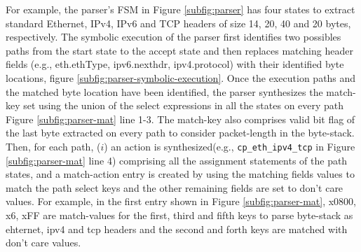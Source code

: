 \documentclass[letterpaper,twocolumn,10pt]{article}
\begin{document}
For example, the parser's FSM in Figure \ref{subfig:parser} has four states to extract standard Ethernet, IPv4, IPv6 and TCP headers of size 14, 20, 40 and 20 bytes, respectively. The symbolic execution of the parser first identifies two possibles paths from the start state to the accept state and  then replaces matching header fields (e.g., eth.ethType, ipv6.nexthdr, ipv4.protocol) with their identified byte locations, figure \ref{subfig:parser-symbolic-execution}.
Once the execution paths and the matched byte location have been identified, the parser synthesizes the match-key set using the union of the select expressions in all the states on every path Figure \ref{subfig:parser-mat} line 1-3.
The match-key also comprises valid bit flag of the last byte extracted on every path to consider packet-length in the byte-stack.
Then, for each path, ($i$) an action is synthesized(e.g., \texttt{cp\_eth\_ipv4\_tcp} in Figure \ref{subfig:parser-mat} line 4) comprising all the assignment statements of the path states, and a match-action entry is created by using the matching fields values to match the path select keys and the other remaining fields are set to don't care values.
For example, in the first entry shown in Figure \ref{subfig:parser-mat}, x0800, x6, xFF are match-values for the first, third and fifth keys to parse byte-stack as ehternet, ipv4 and tcp headers and the second and forth keys are matched with don't care values.




\end{document}
